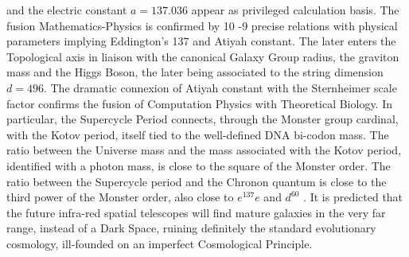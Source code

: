 and the electric constant $a = 137.036$ appear as privileged calculation basis. The fusion
Mathematics-Physics is confirmed by 10 -9 precise relations with physical parameters
implying Eddington's 137 and Atiyah constant. The later enters the Topological axis in
liaison with the canonical Galaxy Group radius, the graviton mass and the Higgs Boson,
the later being associated to the string dimension $d = 496$. The dramatic connexion of
Atiyah constant with the Sternheimer scale factor confirms the fusion of Computation
Physics with Theoretical Biology. In particular, the Supercycle Period connects, through the
Monster group cardinal, with the Kotov period, itself tied to the well-defined DNA bi-codon
mass. The ratio between the Universe mass and the mass associated with the Kotov period,
identified with a photon mass, is close to the square of the Monster order. The ratio between
the Supercycle period and the Chronon quantum is close to the third power of the Monster
order, also close to $e^137e$ and $d^60$ . It is predicted that the future infra-red spatial telescopes
will find mature galaxies in the very far range, instead of a Dark Space, ruining definitely
the standard evolutionary cosmology, ill-founded on an imperfect Cosmological Principle.
